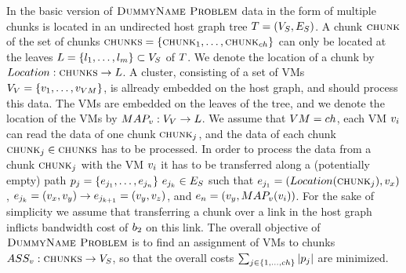 In the basic version of $\textsc{DummyName Problem}$ data in the form of multiple chunks is 
located in an undirected host graph tree $T = (V_S, 
E_S)$. A chunk $\textsc{chunk}$ of the set of chunks $\textsc{chunks} = 
\{\textsc{chunk}_1,\dots,\textsc{chunk}_{ch}\}$ can only be located at the leaves 
$L = \{l_1,\dots,l_m\} \subset V_S$ of $T$. We 
denote the location of a chunk by $Location : \textsc{chunks} \rightarrow 
L$. A cluster, consisting of a set of VMs $V_V = 
\{v_1,\dots,v_{VM}\}$, is allready embedded on the host 
graph, and should process this data. The VMs are embedded on the 
leaves of the tree, and we denote the location of the VMs by $MAP_v : 
V_V \rightarrow L$. We assume that $VM = ch$, each 
VM $v_i$ can read the data of one chunk $\textsc{chunk}_j$, and the data of 
each chunk $\textsc{chunk}_j \in \textsc{chunks}$ has to be processed. In order to process the 
data from a chunk $\textsc{chunk}_j$ with the VM $v_i$ it has to be 
transferred along a (potentially empty) path $p_j = 
\{e_{j_1},\dots,e_{j_n}\} ~ e_{j_k} \in 
E_S$ such that $e_{j_1} = (Location(\textsc{chunk}_j), 
v_x)$, $e_{j_k} = (v_x, 
v_y) \rightarrow e_{j_{k+1}} = (v_y , 
v_z)$, and $e_n = (v_y, 
MAP_v(v_i))$.  For the sake of simplicity we assume that 
transferring a chunk over a link in the host graph inflicts bandwidth cost of 
$b_2$ on this link. The overall objective of $\textsc{DummyName Problem}$ is to find an 
assignment of VMs to chunks $ASS_v : \textsc{chunks} \rightarrow 
V_S$, so that the overall costs $\sum_{j \in 
\{1,\dots,ch\}} |p_j|$ are minimized.


